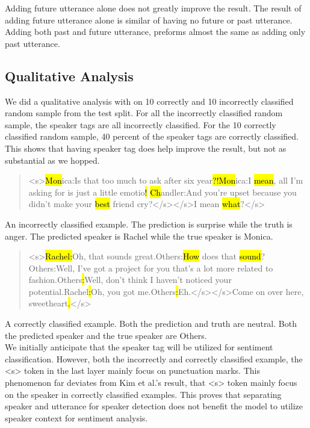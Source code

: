 \documentclass[11pt]{article}
\begin{document}
Adding future utterance alone does not greatly improve the result. The result of adding future utterance alone is similar of having no future or past utterance. Adding both past and future utterance, preforms almost the same as adding only past utterance. 

\subsection{Qualitative Analysis}

We did a qualitative analysis with on 10 correctly and 10 incorrectly classified random sample from the test split. For all the incorrectly classified random sample, the speaker tags are all incorrectly classified. For the 10 correctly classified random sample, 40 percent of the speaker tags are correctly classified. This shows that having speaker tag does help improve the result, but not as substantial as we hopped. 

\begin{quote}

<s>\hl{Mon}ica:Is that too much to ask after six year\hl{?!}\hl{Mon}ica:I \hl{mean}, all I’m asking for is just a little emotio\hl{!} \hl{Ch}andler:And you’re upset because you didn’t make your \hl{best} friend cry?</s></s>I mean \hl{what}?</s>

\end{quote}

An incorrectly classified example. The prediction is surprise while the truth is anger. The predicted speaker is Rachel while the true speaker is Monica.

\begin{quote}

<s>\hl{Rachel}\hl{:}Oh, that sounds great.Others:\hl{How} does that \hl{sound}?Others:Well, I’ve got a project for you that’s a lot more related to fashion.Others\hl{:}Well, don’t think I haven’t noticed your potential.Rachel\hl{:}Oh, you got me.Others\hl{:}Eh.</s></s>Come on over here, sweetheart\hl{.}</s>

\end{quote}

A correctly classified example. Both the prediction and truth are neutral. Both the predicted speaker and the true speaker are Others. \\

We initially anticipate that the speaker tag will be utilized for sentiment classification. However, both the incorrectly and correctly classified example, the <s> token in the last layer mainly focus on punctuation marks. This phenomenon far deviates from Kim et al.'s result, that <s> token mainly focus on the speaker in correctly classified examples. This proves that separating speaker and utterance for speaker detection does not benefit the model to utilize speaker context for sentiment analysis.
\end{document}
